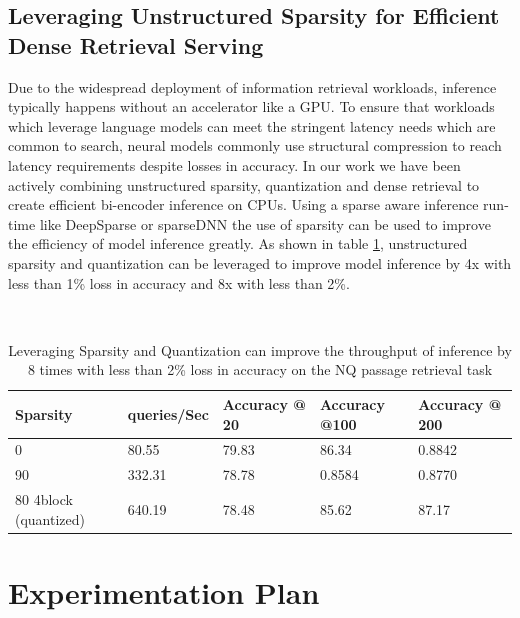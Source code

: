 \subsection{Leveraging Unstructured Sparsity for Efficient Dense Retrieval Serving}
Due to the widespread deployment of information retrieval workloads, inference typically happens without an accelerator like a GPU. To ensure that workloads which leverage language models can meet the stringent latency needs which are common to search, neural models commonly use structural compression to reach latency requirements despite losses in accuracy. In our work we have been actively combining unstructured sparsity, quantization and dense retrieval to create efficient bi-encoder inference on CPUs. Using a sparse aware inference run-time like DeepSparse \cite{deepsparse} or sparseDNN \cite{Wang2021SparseDNNFS} the use of sparsity can be used to improve the efficiency of model inference greatly. As shown in table \ref{tab:sparse-ir}, unstructured sparsity and quantization can be leveraged to improve model inference by 4x with less than 1\% loss in accuracy and 8x with less than 2\%.
\begin{table}[!htb]
    \centering
    \
    \begin{tabular}{|l|l|l|l|l|}
    \hline
        Sparsity & queries/Sec & Accuracy @ 20  & Accuracy @100 & Accuracy @ 200 \\ \hline
        0 & 80.55 & 79.83 & 86.34 & 0.8842 \\ \hline
        90 & 332.31 & 78.78 & 0.8584 & 0.8770 \\ \hline
        80 4block (quantized) & 640.19 & 78.48 & 85.62 & 87.17 \\ \hline
    \end{tabular}
    \caption{Leveraging Sparsity and Quantization can improve the throughput of inference by 8 times with less than 2\% loss in accuracy on the NQ \cite{Kwiatkowski2019NaturalQA} passage retrieval task}
    \label{tab:sparse-ir}
\end{table}

\section{Experimentation Plan}
